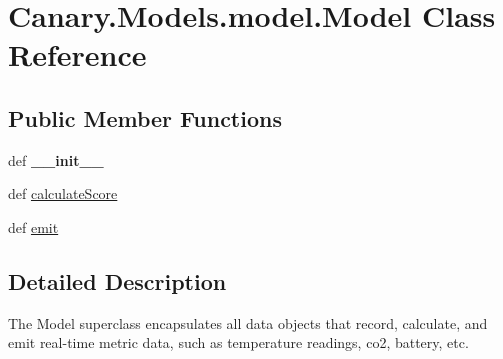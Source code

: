 \hypertarget{class_canary_8_models_1_1model_1_1_model}{\section{Canary.\-Models.\-model.\-Model Class Reference}
\label{class_canary_8_models_1_1model_1_1_model}
}
\subsection*{Public Member Functions}
\begin{DoxyCompactItemize}
\item 
\hypertarget{class_canary_8_models_1_1model_1_1_model_a03e6e9d3507ca34701bb06b9509e1554}{def {\bfseries \-\_\-\-\_\-init\-\_\-\-\_\-}}\label{class_canary_8_models_1_1model_1_1_model_a03e6e9d3507ca34701bb06b9509e1554}

\item 
def \hyperlink{class_canary_8_models_1_1model_1_1_model_aba1612b94a8dafe2095ff01099db094b}{calculate\-Score}
\item 
def \hyperlink{class_canary_8_models_1_1model_1_1_model_a5b89de19de0b9c9d0ddb1d7a272975a2}{emit}
\end{DoxyCompactItemize}


\subsection{Detailed Description}
\begin{DoxyVerb}The Model superclass encapsulates all data objects that record, calculate, and emit real-time metric data, such as temperature readings, co2, battery, etc.\end{DoxyVerb}
 

